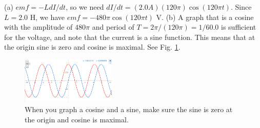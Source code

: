 \documentclass[10pt]{article}
\begin{document}
\begin{enumerate}
\begin{enumerate}
(a) $emf = -L dI/dt$, so we need $dI/dt = (2.0 A) (120\pi) \cos(120\pi t)$.  Since $L = 2.0$ H, we have $emf = -480 \pi \cos(120\pi t)$ V. (b) A graph that is a cosine with the amplitude of $480\pi$ and period of $T = 2\pi / (120 \pi) = 1/60.0$ is sufficient for the voltage, and note that the current is a sine function.  This means that at the origin sine is zero and cosine is maximal. See Fig. \ref{fig:plot1}.
\begin{figure}
\centering
\includegraphics[width=0.4\textwidth]{plot1.png}
\caption{\label{fig:plot1} When you graph a cosine and a sine, make sure the sine is zero at the origin and cosine is maximal.}
\end{figure}
\end{enumerate}
\end{enumerate}
\end{document}
